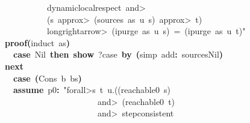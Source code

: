 \documentclass{article}
\newcommand{\syntaxKEYWORDA}[1]{\textcolor[rgb]{0.0,0.4,0.6}{\textbf{#1}}}
\newcommand{\syntaxKEYWORDC}[1]{\textcolor[rgb]{0.0,0.6,1.0}{\textbf{#1}}}
\newcommand{\syntaxLITERALA}[1]{\textcolor[rgb]{1.0,0.0,0.8}{#1}}
\newcommand{\syntaxOPERATOR}[1]{\textcolor[rgb]{0.0,0.0,0.0}{\textbf{#1}}}
\newcommand{\syntaxKEYWORDA}[1]{\textcolor[rgb]{0.0,0.4,0.6}{\textbf{#1}}}
\newcommand{\syntaxKEYWORDC}[1]{\textcolor[rgb]{0.0,0.6,1.0}{\textbf{#1}}}
\newcommand{\syntaxLITERALA}[1]{\textcolor[rgb]{1.0,0.0,0.8}{#1}}
\newcommand{\syntaxOPERATOR}[1]{\textcolor[rgb]{0.0,0.0,0.0}{\textbf{#1}}}
\newcommand{\syntaxKEYWORDA}[1]{\textcolor[rgb]{0.0,0.4,0.6}{\textbf{#1}}}
\newcommand{\syntaxKEYWORDC}[1]{\textcolor[rgb]{0.0,0.6,1.0}{\textbf{#1}}}
\newcommand{\syntaxLITERALA}[1]{\textcolor[rgb]{1.0,0.0,0.8}{#1}}
\newcommand{\syntaxOPERATOR}[1]{\textcolor[rgb]{0.0,0.0,0.0}{\textbf{#1}}}
\newcommand{\syntaxKEYWORDA}[1]{\textcolor[rgb]{0.0,0.4,0.6}{#1}}
\newcommand{\syntaxKEYWORDC}[1]{\textcolor[rgb]{0.0,0.6,1.0}{#1}}
\newcommand{\syntaxLITERALA}[1]{\textcolor[rgb]{1.0,0.0,0.8}{\textbf{#1}}}
\newcommand{\syntaxOPERATOR}[1]{\textcolor[rgb]{0.0,0.0,0.0}{#1}}
\newcommand{\syntaxKEYWORDA}[1]{\textcolor[rgb]{0.0,0.4,0.6}{\textbf{#1}}}
\newcommand{\syntaxKEYWORDC}[1]{\textcolor[rgb]{0.0,0.6,1.0}{\textbf{#1}}}
\newcommand{\syntaxLITERALA}[1]{\textcolor[rgb]{1.0,0.0,0.8}{#1}}
\newcommand{\syntaxOPERATOR}[1]{\textcolor[rgb]{0.0,0.0,0.0}{\textbf{#1}}}
\newcommand{\syntaxKEYWORDA}[1]{\textcolor[rgb]{0.0,0.4,0.6}{\textbf{#1}}}
\newcommand{\syntaxKEYWORDC}[1]{\textcolor[rgb]{0.0,0.6,1.0}{\textbf{#1}}}
\newcommand{\syntaxLITERALA}[1]{\textcolor[rgb]{1.0,0.0,0.8}{#1}}
\newcommand{\syntaxOPERATOR}[1]{\textcolor[rgb]{0.0,0.0,0.0}{\textbf{#1}}}
\begin{document}
\syntaxLITERALA{{\ }{\ }{\ }{\ }{\ }{\ }{\ }{\ }{\ }{\ }{\ }{\ }{\ }{\ }{\ }{\ }{\ }{\ }{\ }{\ }dynamic\usebox{\underscorebox}local\usebox{\underscorebox}respect{\ }\<and>}\hspace*{\fill}\\
\syntaxLITERALA{{\ }{\ }{\ }{\ }{\ }{\ }{\ }{\ }{\ }{\ }{\ }{\ }{\ }{\ }{\ }{\ }{\ }{\ }{\ }{\ }(s{\ }\<approx>{\ }(sources{\ }as{\ }u{\ }s){\ }\<approx>{\ }t)}\hspace*{\fill}\\
\syntaxLITERALA{{\ }{\ }{\ }{\ }{\ }{\ }{\ }{\ }{\ }{\ }{\ }{\ }{\ }{\ }{\ }{\ }{\ }{\ }{\ }{\ }\<longrightarrow>{\ }(ipurge{\ }as{\ }u{\ }s){\ }={\ }(ipurge{\ }as{\ }u{\ }t)"}\hspace*{\fill}\\
{\ }{\ }{\ }{\ }{\ }{\ }{\ }{\ }{\ }{\ }\syntaxKEYWORDA{proof}\syntaxOPERATOR{(}induct{\ }as\syntaxOPERATOR{)}{\ }{\ }{\ }{\ }{\ }{\ }{\ }{\ }{\ }{\ }{\ }{\ }{\ }{\ }{\ }{\ }{\ }{\ }{\ }{\ }{\ }{\ }{\ }{\ }{\ }{\ }{\ }{\ }{\ }{\ }{\ }{\ }{\ }{\ }{\ }{\ }{\ }{\ }{\ }{\ }{\ }\hspace*{\fill}\\
{\ }{\ }{\ }{\ }{\ }{\ }{\ }{\ }{\ }{\ }{\ }{\ }\syntaxKEYWORDC{case}{\ }Nil{\ }\syntaxKEYWORDA{then}{\ }\syntaxKEYWORDC{show}{\ }?case{\ }\syntaxKEYWORDA{by}{\ }\syntaxOPERATOR{(}simp{\ }add\syntaxOPERATOR{:}{\ }sources\usebox{\underscorebox}Nil\syntaxOPERATOR{)}\hspace*{\fill}\\
{\ }{\ }{\ }{\ }{\ }{\ }{\ }{\ }{\ }{\ }\syntaxKEYWORDA{next}\hspace*{\fill}\\
{\ }{\ }{\ }{\ }{\ }{\ }{\ }{\ }{\ }{\ }{\ }{\ }\syntaxKEYWORDC{case}{\ }\syntaxOPERATOR{(}Cons{\ }b{\ }bs\syntaxOPERATOR{)}\hspace*{\fill}\\
{\ }{\ }{\ }{\ }{\ }{\ }{\ }{\ }{\ }{\ }{\ }{\ }\syntaxKEYWORDC{assume}{\ }p0\syntaxOPERATOR{:}{\ }\syntaxLITERALA{"\<forall>s{\ }t{\ }u.((reachable0{\ }s){\ }}\hspace*{\fill}\\
\syntaxLITERALA{{\ }{\ }{\ }{\ }{\ }{\ }{\ }{\ }{\ }{\ }{\ }{\ }{\ }{\ }{\ }{\ }{\ }{\ }{\ }{\ }{\ }{\ }{\ }{\ }{\ }{\ }{\ }{\ }{\ }{\ }{\ }{\ }\<and>{\ }(reachable0{\ }t){\ }}\hspace*{\fill}\\
\syntaxLITERALA{{\ }{\ }{\ }{\ }{\ }{\ }{\ }{\ }{\ }{\ }{\ }{\ }{\ }{\ }{\ }{\ }{\ }{\ }{\ }{\ }{\ }{\ }{\ }{\ }{\ }{\ }{\ }{\ }{\ }{\ }{\ }{\ }\<and>{\ }step\usebox{\underscorebox}consistent{\ }}\hspace*{\fill}\\
\end{document}
